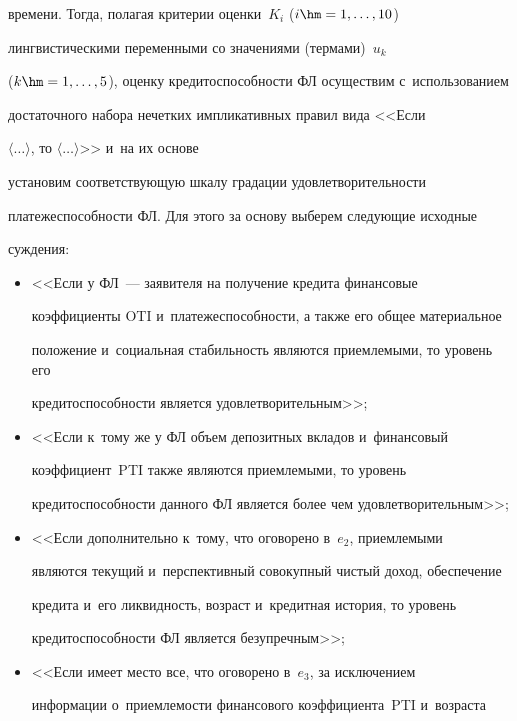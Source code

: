 времени. Тогда, полагая критерии оценки~$K_i$ ($i\hm=1, \ldots, 10$) 

лингвистическими переменными со значениями (термами)~$u_k$ 

($k\hm=1, \ldots ,5$), оценку кредитоспособности ФЛ осуществим с~использованием 

достаточного набора нечетких импликативных правил вида <<Если 

$\langle$$\ldots$$\rangle$, то $\langle$$\ldots$$\rangle$>> и~на их основе 

установим соответствующую шкалу градации удовлетворительности 

платежеспособности ФЛ. Для этого за основу выберем следующие исходные 

суждения:

 \begin{itemize} 

\item[$e_1$:] <<Если у ФЛ~--- заявителя на получение кредита финансовые 

коэффициенты OTI и~платежеспособности, а также его общее материальное 

положение и~социальная стабильность являются приемлемыми, то уровень его 

кредитоспособности является удовлетворительным>>; 

  

\item[$e_2$:] <<Если к~тому же у ФЛ объем депозитных вкладов и~финансовый 

коэффициент~PTI также являются приемлемыми, то уровень 

кредитоспособности данного ФЛ является более чем удовлетворительным>>; 

  

\item[$e_3$:] <<Если дополнительно к~тому, что оговорено в~$e_2$, приемлемыми 

являются текущий и~перспективный совокупный чистый доход, обеспечение 

кредита и~его ликвидность, возраст и~кредитная история, то уровень 

кредитоспособности ФЛ является безупречным>>; 

  

 \item[$e_4$:] <<Если имеет место все, что оговорено в~$e_3$, за исключением 

информации о~приемлемости финансового коэффициента~PTI и~возраста 


\end{itemize}
